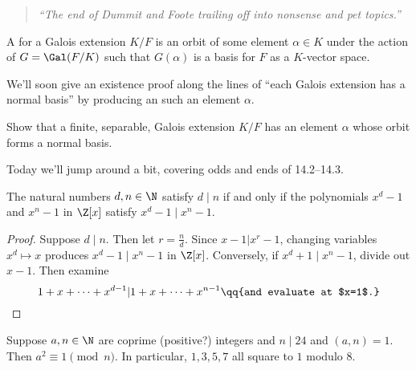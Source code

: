 \begin{quote}\textit{
    ``The end of Dummit and Foote trailing off into nonsense and pet topics.''
}\end{quote}

\begin{defn}
    A  for a Galois extension $K/F$ is an orbit of some element $\alpha \in K$ under the action of $G = \Gal(F/K)$ such that $G(\alpha)$ is a basis for $F$ as a $K$-vector space.
\end{defn}

We'll soon give an existence proof along the lines of ``each Galois extension has a normal basis'' by producing an such an element $\alpha$. 

\begin{ex}[]
    Show that a finite, separable, Galois extension $K/F$ has an element $\alpha$ whose orbit forms a normal basis.
\end{ex}

Today we'll jump around a bit, covering odds and ends of 14.2--14.3.

\begin{lem}[]
    \label{polydivisors}
    The natural numbers $d,n \in \N$ satisfy $d \mid n$ if and only if the polynomials $x^d -1$ and $x^n -1$ in $\Z[x]$ satisfy $x^d - 1 \mid x^n -1$.
    \begin{proof}
    Suppose $d \mid n$. Then let $r = \frac n d$. Since $x -1 | x^r -1$, changing variables $x^d \mapsto x$ produces $x^d -1 \mid x^n -1$ in $\Z[x]$. Conversely, if $x^d + 1 \mid x^n -1$, divide out $x-1$. Then examine
    \[
        1+ x + \cdots + x^{d-1} | 1 + x + \cdots + x^{n-1}  \qq{and evaluate at $x=1$.}
    \]
    \end{proof}
\end{lem}

\begin{lem}[Divisors of $24$]
    \label{24divisors}
    
    Suppose $a,n \in \N$ are coprime (positive?) integers and $n \mid 24$ and $(a,n) = 1$. Then $a^2 \equiv 1 \pmod{n}$. In particular, $1,3,5,7$ all square to $1$ modulo $8$.
\end{lem}

